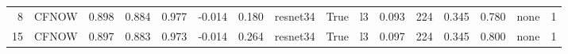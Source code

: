 \begin{tabular}{rlrrrrrlllrlrrlr}
     8 &  CFNOW &           0.898 &    0.884 &       0.977 &                         -0.014 &                0.180 &        resnet34 &               True &                l3 &                          0.093 &                   224 &                      0.345 &                       0.780 &                         none &        1 \\
    15 &  CFNOW &           0.897 &    0.883 &       0.973 &                         -0.014 &                0.264 &        resnet34 &               True &                l3 &                          0.097 &                   224 &                      0.345 &                       0.800 &                         none &        1 \\
\bottomrule
\end{tabular}
